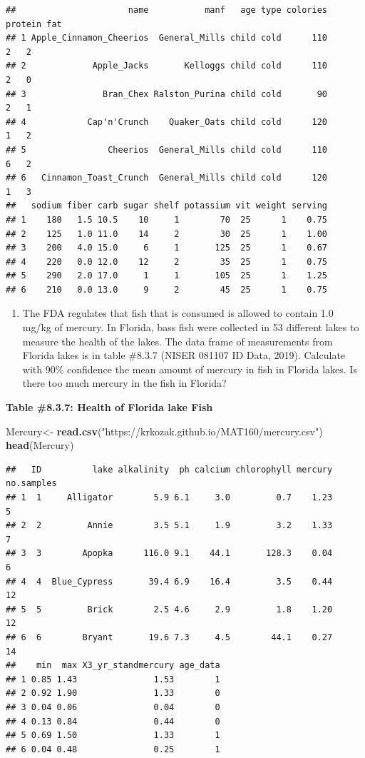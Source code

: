 \documentclass[]{book}
\newenvironment{Shaded}{\begin{snugshade}}{\end{snugshade}}
\newcommand{\KeywordTok}[1]{\textcolor[rgb]{0.13,0.29,0.53}{\textbf{#1}}}
\newcommand{\NormalTok}[1]{#1}
\newcommand{\StringTok}[1]{\textcolor[rgb]{0.31,0.60,0.02}{#1}}
\providecommand{\tightlist}{%
  \setlength{\itemsep}{0pt}\setlength{\parskip}{0pt}}
\begin{document}
\begin{verbatim}
##                      name           manf   age type colories protein fat
## 1 Apple_Cinnamon_Cheerios  General_Mills child cold      110       2   2
## 2             Apple_Jacks       Kelloggs child cold      110       2   0
## 3               Bran_Chex Ralston_Purina child cold       90       2   1
## 4            Cap'n'Crunch    Quaker_Oats child cold      120       1   2
## 5                Cheerios  General_Mills child cold      110       6   2
## 6   Cinnamon_Toast_Crunch  General_Mills child cold      120       1   3
##   sodium fiber carb sugar shelf potassium vit weight serving
## 1    180   1.5 10.5    10     1        70  25      1    0.75
## 2    125   1.0 11.0    14     2        30  25      1    1.00
## 3    200   4.0 15.0     6     1       125  25      1    0.67
## 4    220   0.0 12.0    12     2        35  25      1    0.75
## 5    290   2.0 17.0     1     1       105  25      1    1.25
## 6    210   0.0 13.0     9     2        45  25      1    0.75
\end{verbatim}

\begin{enumerate}
\def\labelenumi{\arabic{enumi}.}
\setcounter{enumi}{2}
\tightlist
\item
  The FDA regulates that fish that is consumed is allowed to contain 1.0 mg/kg of mercury. In Florida, bass fish were collected in 53 different lakes to measure the health of the lakes. The data frame of measurements from Florida lakes is in table \#8.3.7 (NISER 081107 ID Data, 2019). Calculate with 90\% confidence the mean amount of mercury in fish in Florida lakes. Is there too much mercury in the fish in Florida?
\end{enumerate}

\textbf{Table \#8.3.7: Health of Florida lake Fish}

\begin{Shaded}
\begin{Highlighting}[]
\NormalTok{Mercury<-}\StringTok{ }\KeywordTok{read.csv}\NormalTok{(}\StringTok{"https://krkozak.github.io/MAT160/mercury.csv"}\NormalTok{)}
\KeywordTok{head}\NormalTok{(Mercury)}
\end{Highlighting}
\end{Shaded}

\begin{verbatim}
##   ID          lake alkalinity  ph calcium chlorophyll mercury no.samples
## 1  1     Alligator        5.9 6.1     3.0         0.7    1.23          5
## 2  2         Annie        3.5 5.1     1.9         3.2    1.33          7
## 3  3        Apopka      116.0 9.1    44.1       128.3    0.04          6
## 4  4  Blue_Cypress       39.4 6.9    16.4         3.5    0.44         12
## 5  5         Brick        2.5 4.6     2.9         1.8    1.20         12
## 6  6        Bryant       19.6 7.3     4.5        44.1    0.27         14
##    min  max X3_yr_standmercury age_data
## 1 0.85 1.43               1.53        1
## 2 0.92 1.90               1.33        0
## 3 0.04 0.06               0.04        0
## 4 0.13 0.84               0.44        0
## 5 0.69 1.50               1.33        1
## 6 0.04 0.48               0.25        1
\end{verbatim}
\end{document}
